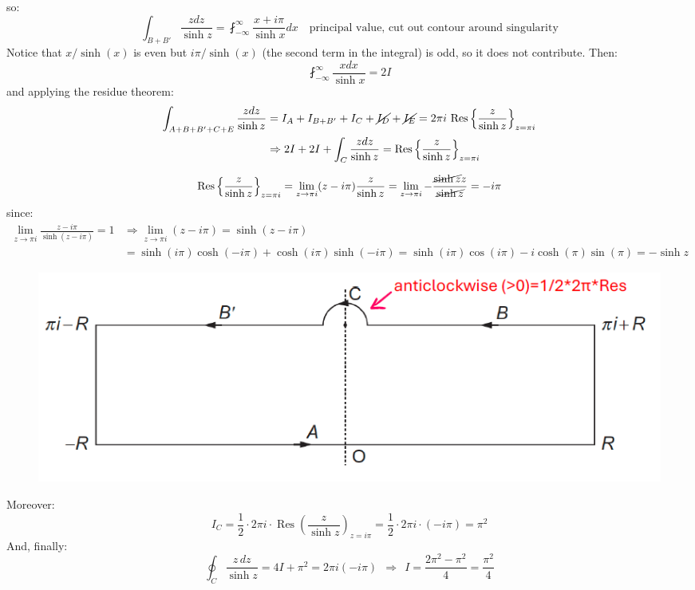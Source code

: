 \documentclass{article}
\begin{document}
\newpage

\noindent
so:
\begin{equation}
    \int_{B+B'} \frac{zdz}{\sinh{z}} = \fint_{-\infty}^\infty \frac{x + i\pi}{\sinh{x}}dx \quad \text{principal value, cut out contour around
singularity}
\end{equation}
Notice that $x/\sinh(x)$ is even but $i\pi/\sinh(x)$ (the second term in the integral) is odd, so it does not contribute. Then:
\begin{equation}
    \fint_{-\infty}^\infty \frac{x dx}{\sinh{x}} = 2I
\end{equation}
and applying the residue theorem:
\begin{align}
    \int_{A+B+B'+C+E} \frac{zdz}{\sinh{z}} &= I_A + I_{B+B'} + I_C + \cancel{I_D} + \cancel{I_E} = 2\pi i \ \text{Res} \left\{ \frac{z}{\sinh{z}} \right\}_{z = \pi i }\\
    &\Rightarrow 2I + 2I + \int_C \frac{zdz}{\sinh{z}} =\text{Res} \left\{ \frac{z}{\sinh{z}} \right\}_{z = \pi i }
\end{align}

\begin{equation}
    \text{Res} \left\{ \frac{z}{\sinh{z}} \right\}_{z = \pi i } = \lim_{z \rightarrow \pi i } (z - i\pi) \frac{z}{\sinh{z}} = \lim_{z \rightarrow \pi i } - \frac{\cancel{\sinh{z} }z}{\cancel{\sinh{z}}} = -i\pi
\end{equation}
since:
\begin{align*}
    \lim_{z \rightarrow \pi i } \frac{z-i\pi}{\sinh{(z-i\pi)}} = 1 &\Rightarrow \lim_{z \rightarrow \pi i }(z-i\pi) = \sinh{(z-i\pi)}\\
    &= \sinh{(i\pi)} \cosh{(-i\pi)} + \cosh (i\pi) \sinh(-i\pi)= \sinh (i\pi)   \cos (i\pi) -i \cosh (\pi) \sin (\pi) = -\sinh z
\end{align*}

\begin{figure}[h]
    \centering
    \includegraphics[width=0.7\linewidth]{fig47.png}
\end{figure}

\noindent
Moreover:
\begin{equation}
    I_C = \frac{1}{2} \cdot 2\pi i \cdot \operatorname{Res} \left( \frac{z}{\sinh z} \right)_{ z = i\pi}
= \frac{1}{2} \cdot 2\pi i \cdot (-i\pi) = \pi^2
\end{equation}
And, finally:
\begin{equation}
    \oint_C \frac{z\,dz}{\sinh z} = 4I + \pi^2 = 2\pi i (-i\pi)
\ \ \Rightarrow \ \  I = \frac{2\pi^2 - \pi^2}{4} = \frac{\pi^2}{4}
\end{equation}
\end{document}
